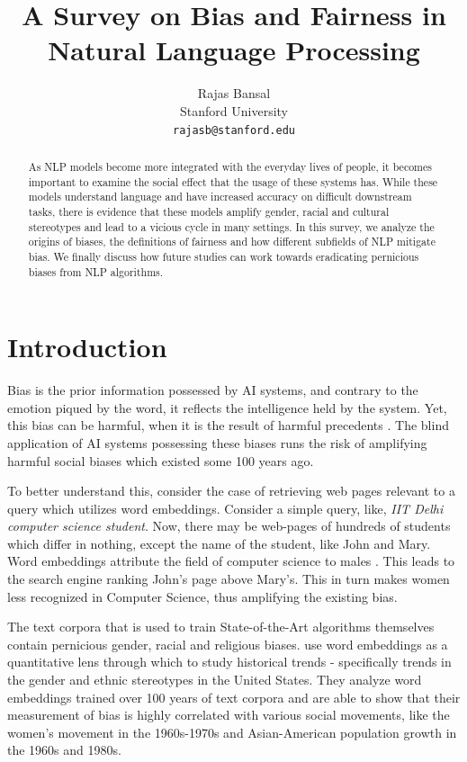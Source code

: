 \documentclass[11pt,a4paper]{article}
\title{A Survey on Bias and Fairness in Natural Language Processing}
\author{Rajas Bansal \\
  Stanford University \\
  \texttt{rajasb@stanford.edu} \\}
\date{}
\begin{document}
\maketitle

\begin{abstract}
As NLP models become more integrated with the everyday lives of people, it becomes important to examine the social effect that the usage of these systems has.
While these models understand language and have increased accuracy on difficult downstream tasks, there is evidence that these models amplify gender, racial and cultural stereotypes and lead to a vicious cycle in many settings.
In this survey, we analyze the origins of biases, the definitions of fairness and how different subfields of NLP mitigate bias. We finally discuss how future studies can work towards eradicating pernicious biases from NLP algorithms.
\end{abstract}

\section{Introduction}
Bias is the prior information possessed by AI systems, and contrary to the emotion piqued by the word, it reflects the intelligence held by the system. Yet, this bias can be harmful, when it is the result of harmful precedents \cite{Caliskan183}. The blind application of AI systems possessing these biases runs the risk of amplifying harmful social biases which existed some 100 years ago. 

To better understand this, consider the case of retrieving web pages relevant to a query which utilizes word embeddings. Consider a simple query, like, \textit{IIT Delhi computer science student}. Now, there may be web-pages of hundreds of students which differ in nothing, except the name of the student, like John and Mary. Word embeddings attribute the field of computer science to males \cite{NIPS2016_6228}. This leads to the search engine ranking John's page above Mary's. This in turn makes women less recognized in Computer Science, thus amplifying the existing bias. 

The text corpora that is used to train State-of-the-Art algorithms themselves contain pernicious gender, racial and religious biases. \citet{garg-etal-2017-cvbed} use word embeddings as a quantitative lens through which to study historical trends - specifically trends in the gender and ethnic stereotypes in the United States. They analyze word embeddings trained over 100 years of text corpora and are able to show that their measurement of bias is highly correlated with various social movements, like the women's movement in the 1960s-1970s and Asian-American population growth in the 1960s and 1980s. 
\end{document}
